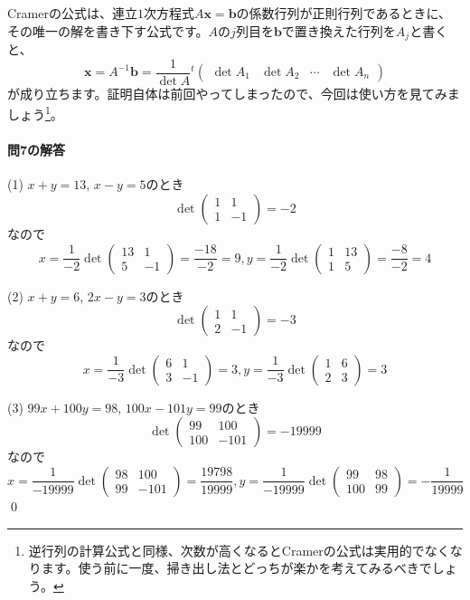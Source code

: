 Cramerの公式は、連立$1$次方程式$A \bm{x} = \bm{b}$の係数行列が正則行列であるときに、その唯一の解を書き下す公式です。$A$の$j$列目を$\bm{b}$で置き換えた行列を$A_j$と書くと、
\[
\bm{x} = A^{-1} \bm{b} = \frac{1}{\det A} {}^t\!
\begin{pmatrix}
\det A_1 & \det A_2 & \cdots & \det A_n
\end{pmatrix}
\]
が成り立ちます。証明自体は前回やってしまったので、今回は使い方を見てみましょう\footnote{逆行列の計算公式と同様、次数が高くなるとCramerの公式は実用的でなくなります。使う前に一度、掃き出し法とどっちが楽かを考えてみるべきでしょう。}。

\paragraph{問7の解答}

(1) $x + y = 13$, $x - y = 5$のとき
\[
\det
\begin{pmatrix}
1 & 1 \\
1 & -1
\end{pmatrix}
= -2
\]
なので
\[
x = \frac{1}{-2} \det
\begin{pmatrix}
13 & 1 \\
5 & -1
\end{pmatrix}
= \frac{-18}{-2} = 9, 
y = \frac{1}{-2} \det
\begin{pmatrix}
1 & 13 \\
1 & 5
\end{pmatrix}
= \frac{-8}{-2} = 4
\]

\noindent (2) $x + y = 6$, $2x - y = 3$のとき
\[
\det
\begin{pmatrix}
1 & 1 \\
2 & -1
\end{pmatrix}
= -3
\]
なので
\[
x = \frac{1}{-3} \det
\begin{pmatrix}
6 & 1 \\
3 & -1
\end{pmatrix}
= 3, 
y = \frac{1}{-3} \det
\begin{pmatrix}
1 & 6 \\
2 & 3
\end{pmatrix}
= 3
\]

\noindent (3) $99 x + 100 y = 98$, $100 x - 101 y = 99$のとき
\[
\det
\begin{pmatrix}
99 & 100 \\
100 & -101
\end{pmatrix}
= -19999
\]
なので
\[
x = \frac{1}{-19999} \det
\begin{pmatrix}
98 & 100 \\
99 & -101
\end{pmatrix}
= \frac{19798}{19999}, 
y = \frac{1}{-19999} \det
\begin{pmatrix}
99 & 98 \\
100 & 99
\end{pmatrix}
= -\frac{1}{19999}
\]
\qed

